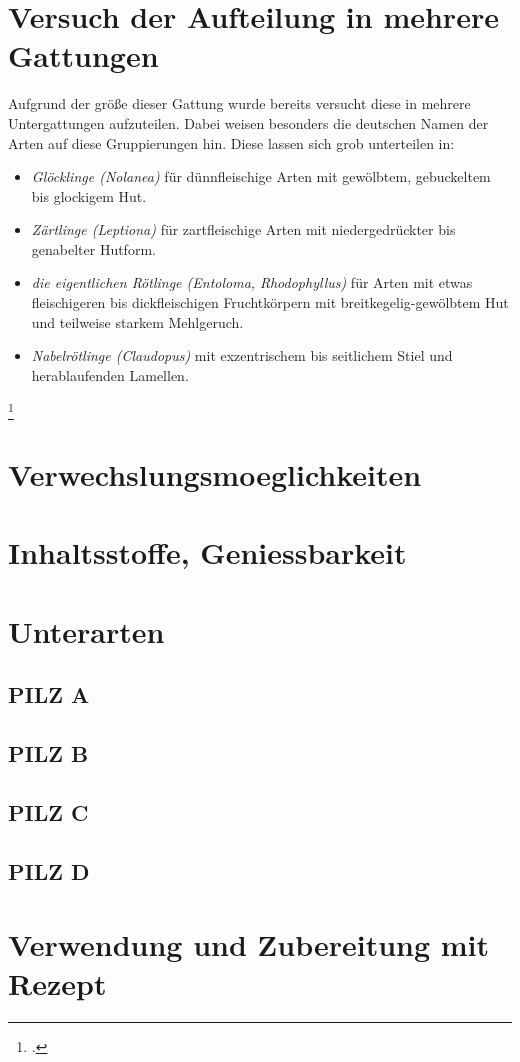 \documentclass[a4paper,abstracton]{scrreprt}
\begin{document}
\section{Versuch der Aufteilung in mehrere Gattungen}
Aufgrund der größe dieser Gattung wurde bereits versucht diese in mehrere Untergattungen aufzuteilen. Dabei weisen besonders die deutschen Namen der Arten auf diese Gruppierungen hin. Diese lassen sich grob unterteilen in:
\begin{itemize}
\item \emph{Glöcklinge (Nolanea)} für dünnfleischige Arten mit gewölbtem, gebuckeltem bis glockigem Hut.
\item \emph{Zärtlinge (Leptiona)} für zartfleischige Arten mit niedergedrückter bis genabelter Hutform.
\item \emph{die eigentlichen Rötlinge (Entoloma, Rhodophyllus)} für Arten mit etwas fleischigeren bis dickfleischigen Fruchtkörpern mit breitkegelig-gewölbtem Hut und teilweise starkem Mehlgeruch.
\item \emph{Nabelrötlinge (Claudopus)} mit exzentrischem bis seitlichem Stiel und herablaufenden Lamellen.
\end{itemize}
\footcite{beschreibung}


\section{Verwechslungsmoeglichkeiten}
\section{Inhaltsstoffe, Geniessbarkeit}
\section{Unterarten}
\subsection{PILZ A}
\subsection{PILZ B}
\subsection{PILZ C}
\subsection{PILZ D}
\section{Verwendung und Zubereitung mit Rezept}

\printbibliography[heading=lit]
\end{document}
